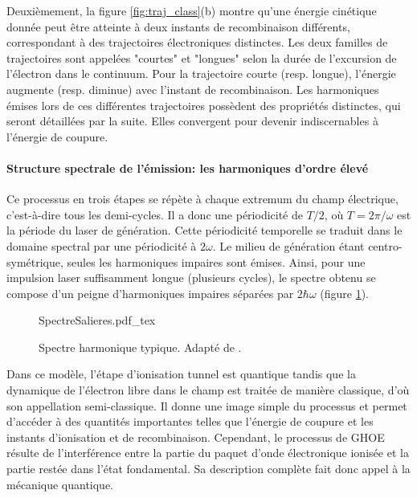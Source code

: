 Deuxièmement, la figure \ref{fig:traj_class}(b) montre qu'une énergie cinétique donnée peut être atteinte à deux instants de recombinaison différents, correspondant à des trajectoires électroniques distinctes. Les deux familles de trajectoires sont appelées "courtes" et "longues" selon la durée de l'excursion de l'électron dans le continuum. Pour la trajectoire courte (resp. longue), l'énergie augmente (resp. diminue) avec l'instant de recombinaison. Les harmoniques émises lors de ces différentes trajectoires possèdent des propriétés distinctes, qui seront détaillées par la suite. Elles convergent pour devenir indiscernables à l'énergie de coupure.

\paragraph{Structure spectrale de l'émission: les harmoniques d'ordre élevé} Ce processus en trois étapes se répète à chaque extremum du champ électrique, c'est-à-dire tous les demi-cycles. Il a donc une périodicité de $T/2$, où $T = 2 \pi /\omega$ est la période du laser de génération. Cette périodicité temporelle se traduit dans le domaine spectral par une périodicité à $2 \omega$. Le milieu de génération étant centro-symétrique, seules les harmoniques impaires sont émises. Ainsi, pour une impulsion laser suffisamment longue (plusieurs cycles), le spectre obtenu se compose d'un peigne d'harmoniques impaires séparées par $2 \hbar \omega$ (figure \ref{fig:SpectreSalieres}).

\begin{figure}
\centering
\def\svgwidth{0.6\columnwidth}
{SpectreSalieres.pdf_tex}
\caption{Spectre harmonique typique. Adapté de .}
\label{fig:SpectreSalieres}
\end{figure}

Dans ce modèle, l'étape d'ionisation tunnel est quantique tandis que la dynamique de l'électron libre dans le champ est traitée de manière classique, d'où  son appellation semi-classique. Il donne une image simple du processus et permet d'accéder à des quantités importantes telles que l'énergie de coupure et les instants d'ionisation et de recombinaison. Cependant, le processus de GHOE résulte de l'interférence entre la partie du paquet d'onde électronique ionisée et la partie restée dans l'état fondamental. Sa description complète fait donc appel à la mécanique quantique.

